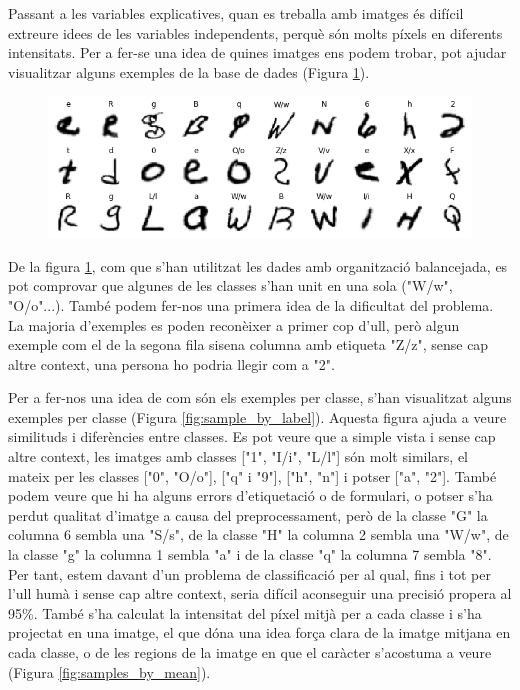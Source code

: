 \documentclass[12pt, spanish]{article}
\begin{document}
Passant a les variables explicatives, quan es treballa amb imatges és difícil extreure idees de les variables independents, perquè són molts píxels en diferents intensitats. Per a fer-se una idea de quines imatges ens podem trobar,  pot ajudar visualitzar alguns exemples de la base de dades (Figura \ref{fig:sample_random}).

\begin{figure}[hbt!]
\centering
	\includegraphics[width=1\textwidth]{images/samples_balanced.png}
	\label{fig:sample_random}
\end{figure}

De la figura \ref{fig:sample_random}, com que s'han utilitzat les dades amb organització balancejada, es pot comprovar que algunes  de les classes s'han unit en una sola ("W/w", "O/o"...). També podem fer-nos una primera idea de la dificultat del problema. La majoria d'exemples es poden reconèixer a primer cop d'ull, però algun exemple com el de la segona fila sisena columna amb etiqueta "Z/z", sense cap altre context, una persona ho podria llegir com a "2".

Per a fer-nos una idea de com són els exemples per classe, s'han visualitzat alguns exemples per classe (Figura \ref{fig:sample_by_label}). Aquesta figura ajuda a veure similituds i diferències entre classes. Es pot veure que a simple vista i sense cap altre context, les imatges amb classes ["1", "I/i", "L/l"] són molt similars, el mateix per les classes ["0", "O/o"], ["q" i "9"], ["h", "n"] i potser ["a", "2"]. També podem veure que hi ha alguns errors d'etiquetació o de formulari, o potser s'ha perdut qualitat d'imatge a causa del preprocessament, però de la classe "G" la columna 6 sembla una "S/s", de la classe "H" la columna 2 sembla una "W/w", de la classe "g" la columna 1 sembla "a" i de la classe "q" la columna 7 sembla "8". Per tant, estem davant d'un problema de classificació per al qual, fins i tot per l'ull humà i sense cap altre context, seria difícil aconseguir una precisió propera al 95\%. També s'ha calculat la intensitat del píxel mitjà per a cada classe i s'ha projectat en una imatge, el que dóna una idea força clara de la imatge mitjana en cada classe, o de les regions de la imatge en que el caràcter s'acostuma a veure (Figura \ref{fig:samples_by_mean}).
\end{document}
